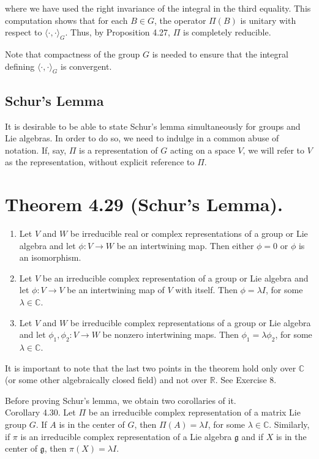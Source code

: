 \documentclass[10pt, letterpaper]{article}
\begin{document}
where we have used the right invariance of the integral in the third equality. This computation shows that for each $B \in G$, the operator $\Pi(B)$ is unitary with respect to $\langle\cdot, \cdot\rangle_{G}$. Thus, by Proposition 4.27, $\Pi$ is completely reducible.

Note that compactness of the group $G$ is needed to ensure that the integral defining $\langle\cdot, \cdot\rangle_{G}$ is convergent.

\subsection*{Schur's Lemma}
It is desirable to be able to state Schur's lemma simultaneously for groups and Lie algebras. In order to do so, we need to indulge in a common abuse of notation. If, say, $\Pi$ is a representation of $G$ acting on a space $V$, we will refer to $V$ as the representation, without explicit reference to $\Pi$.

\section*{Theorem 4.29 (Schur's Lemma).}
\begin{enumerate}
  \item Let $V$ and $W$ be irreducible real or complex representations of a group or Lie algebra and let $\phi: V \rightarrow W$ be an intertwining map. Then either $\phi=0$ or $\phi$ is an isomorphism.
  \item Let $V$ be an irreducible complex representation of a group or Lie algebra and let $\phi: V \rightarrow V$ be an intertwining map of $V$ with itself. Then $\phi=\lambda I$, for some $\lambda \in \mathbb{C}$.
  \item Let $V$ and $W$ be irreducible complex representations of a group or Lie algebra and let $\phi_{1}, \phi_{2}: V \rightarrow W$ be nonzero intertwining maps. Then $\phi_{1}=\lambda \phi_{2}$, for some $\lambda \in \mathbb{C}$.
\end{enumerate}

It is important to note that the last two points in the theorem hold only over $\mathbb{C}$ (or some other algebraically closed field) and not over $\mathbb{R}$. See Exercise 8.

Before proving Schur's lemma, we obtain two corollaries of it.\\
Corollary 4.30. Let $\Pi$ be an irreducible complex representation of a matrix Lie group $G$. If $A$ is in the center of $G$, then $\Pi(A)=\lambda I$, for some $\lambda \in \mathbb{C}$. Similarly, if $\pi$ is an irreducible complex representation of a Lie algebra $\mathfrak{g}$ and if $X$ is in the center of $\mathfrak{g}$, then $\pi(X)=\lambda I$.
\end{document}
